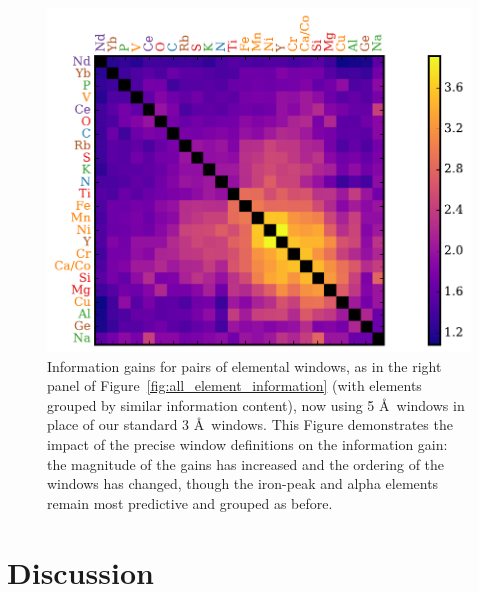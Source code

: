 \documentclass[a4paper,fleqn,usenatbib]{mnras}
\begin{document}
\begin{figure}
	\includegraphics[width=\columnwidth]{apogee_centers_final_29502_spc_sorted_inf_gains_abs_min_tot_dist.pdf}
    \caption{Information gains for pairs of elemental windows, as in the right panel of  Figure~\ref{fig:all_element_information} (with elements grouped by similar information content), now using 5 \AA\ windows in place of our standard 3 \AA\ windows. This Figure demonstrates the impact of the precise window definitions on the information gain: the magnitude of the gains has increased and the ordering of the windows has changed, though the iron-peak and alpha elements remain most predictive and grouped as before.}
    \label{fig:all_element_information_wide}
\end{figure}




\section{Discussion}
\label{sec:discussion}
\end{document}
